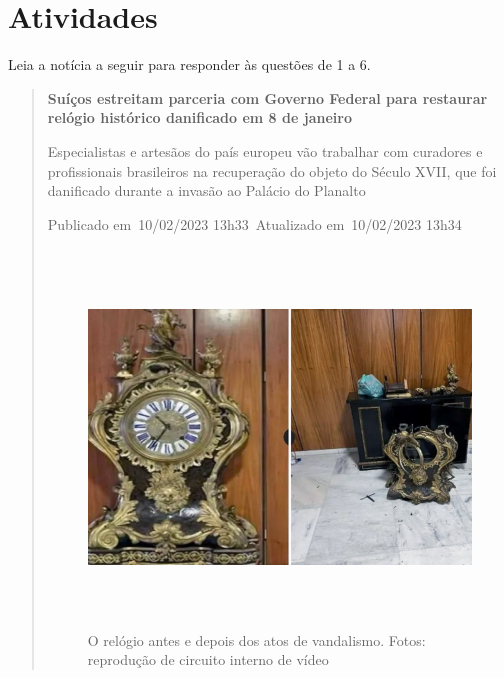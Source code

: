 \section{Atividades}

Leia a notícia a seguir para responder às questões de 1 a 6.


\begin{quote}
\textbf{Suíços estreitam parceria com Governo Federal para restaurar
relógio histórico danificado em 8 de janeiro}

Especialistas e artesãos do país europeu vão trabalhar com curadores e
profissionais brasileiros na recuperação do objeto do Século XVII, que
foi danificado durante a invasão ao Palácio do Planalto

Publicado em~10/02/2023 13h33~Atualizado em~10/02/2023 13h34

\begin{figure}
\centering
\includegraphics[width=5.90556in,height=3.93681in]{./_SAEB_9_POR/media/image8.jpeg}
\caption{O relógio antes e depois dos atos de vandalismo. Fotos: reprodução de
circuito interno de vídeo}
\end{figure}


\end{quote}

